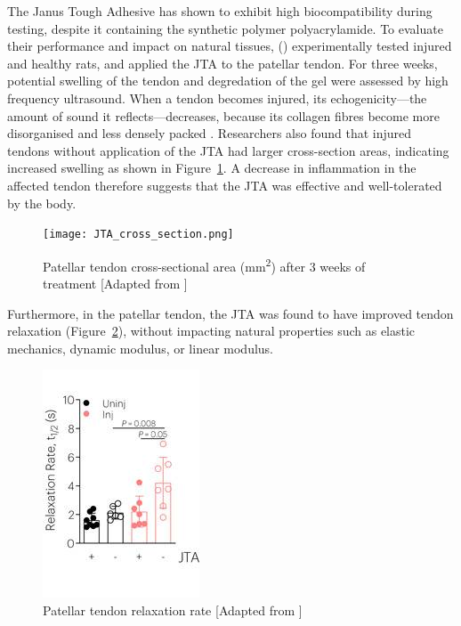 The Janus Tough Adhesive has shown to exhibit high biocompatibility during testing, despite it containing the synthetic polymer polyacrylamide. To evaluate their performance and impact on natural tissues, \citeauthor{freedmanEnhancedTendonHealing2022} (\citeyear{freedmanEnhancedTendonHealing2022}) experimentally tested  injured and healthy rats, and applied the JTA to the patellar tendon.
For three weeks, potential swelling of the tendon and degredation of the gel were assessed by high frequency ultrasound. When a tendon becomes injured, its echogenicity---the amount of sound it reflects---decreases, because its collagen fibres become more disorganised and less densely packed \autocite{hodgsonTendonLigamentImaging2012}.
Researchers also found that injured tendons without application of the JTA had larger cross-section areas, indicating increased swelling as shown in Figure~\ref{fig:JTA_Patellar_cross_section}. A decrease in inflammation in the affected tendon therefore suggests that the JTA was effective and well-tolerated by the body.
\begin{figure}[ht]
    \centering
    \texttt{[image: JTA\_cross\_section.png]}
    \caption{Patellar tendon cross-sectional area (mm\textsuperscript{2}) after 3 weeks of treatment [Adapted from \cite{freedmanEnhancedTendonHealing2022}]}
    \label{fig:JTA_Patellar_cross_section}
\end{figure}

Furthermore, in the patellar tendon, the JTA was found to have improved tendon relaxation (Figure~\ref{fig:JTA_Patellar_relaxation}), without impacting natural properties such as elastic mechanics, dynamic modulus, or linear modulus.
\begin{figure}[ht]
    \centering
    \includegraphics[width=0.6\linewidth]{Figures/JTA_relaxation_patellar.jpeg}
    \caption{Patellar tendon relaxation rate [Adapted from \cite{freedmanEnhancedTendonHealing2022}]}
    \label{fig:JTA_Patellar_relaxation}
\end{figure}

